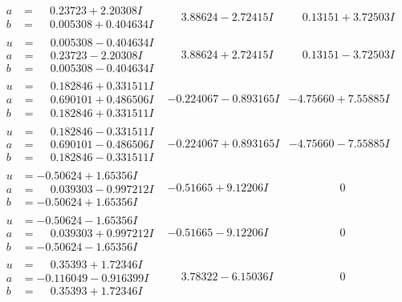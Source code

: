 \documentclass[1p]{elsarticle_modified}
\theoremstyle{definition}
\begin{document}
$$\begin{array}{c|c|c}
\begin{aligned}
a &= \phantom{-}0.23723 + 2.20308 I \\
b &= \phantom{-}0.005308 + 0.404634 I\end{aligned}
 & \phantom{-}3.88624 - 2.72415 I & \phantom{-}0.13151 + 3.72503 I \\ \hline\begin{aligned}
u &= \phantom{-}0.005308 - 0.404634 I \\
a &= \phantom{-}0.23723 - 2.20308 I \\
b &= \phantom{-}0.005308 - 0.404634 I\end{aligned}
 & \phantom{-}3.88624 + 2.72415 I & \phantom{-}0.13151 - 3.72503 I \\ \hline\begin{aligned}
u &= \phantom{-}0.182846 + 0.331511 I \\
a &= \phantom{-}0.690101 + 0.486506 I \\
b &= \phantom{-}0.182846 + 0.331511 I\end{aligned}
 & -0.224067 - 0.893165 I & -4.75660 + 7.55885 I \\ \hline\begin{aligned}
u &= \phantom{-}0.182846 - 0.331511 I \\
a &= \phantom{-}0.690101 - 0.486506 I \\
b &= \phantom{-}0.182846 - 0.331511 I\end{aligned}
 & -0.224067 + 0.893165 I & -4.75660 - 7.55885 I \\ \hline\begin{aligned}
u &= -0.50624 + 1.65356 I \\
a &= \phantom{-}0.039303 - 0.997212 I \\
b &= -0.50624 + 1.65356 I\end{aligned}
 & -0.51665 + 9.12206 I & \phantom{-0.000000 } 0 \\ \hline\begin{aligned}
u &= -0.50624 - 1.65356 I \\
a &= \phantom{-}0.039303 + 0.997212 I \\
b &= -0.50624 - 1.65356 I\end{aligned}
 & -0.51665 - 9.12206 I & \phantom{-0.000000 } 0 \\ \hline\begin{aligned}
u &= \phantom{-}0.35393 + 1.72346 I \\
a &= -0.116049 - 0.916399 I \\
b &= \phantom{-}0.35393 + 1.72346 I\end{aligned}
 & \phantom{-}3.78322 - 6.15036 I & \phantom{-0.000000 } 0 \\ \hline\begin{aligned}

\end{aligned}
\end{array}$$
\end{document}
